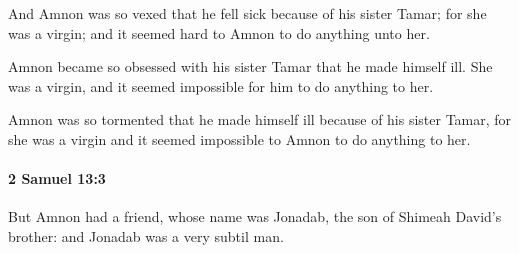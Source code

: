 			\begin{versebox}
					\item[BHS] 
					\item[ASV] And Amnon was so vexed that he fell sick because of his sister Tamar; for she was a virgin; and it seemed hard to Amnon to do anything unto her.
					\item[NIV] Amnon became so obsessed with his sister Tamar that he made himself ill. She was a virgin, and it seemed impossible for him to do anything to her.
					\item[NRSV] Amnon was so tormented that he made himself ill because of his sister Tamar, for she was a virgin and it seemed impossible to Amnon to do anything to her.
			\end{versebox}

		\paragraph{2 Samuel 13:3} %
			\label{2SAMUEL-13-3}

			But Amnon had a friend, whose name was Jonadab, the son of Shimeah David’s brother: and Jonadab was a very subtil man.

